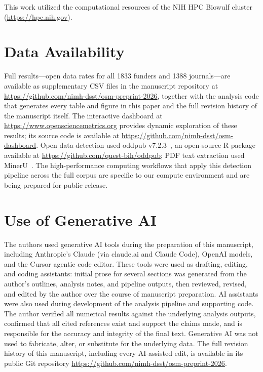 This work utilized the computational resources of the NIH HPC Biowulf cluster (\url{https://hpc.nih.gov}).

\section*{Data Availability}

Full results---open data rates for all \num{1833} funders and \num{1388} journals---are available as supplementary CSV files in the manuscript repository at \url{https://github.com/nimh-dsst/osm-preprint-2026}, together with the analysis code that generates every table and figure in this paper and the full revision history of the manuscript itself. The interactive dashboard at \url{https://www.opensciencemetrics.org} provides dynamic exploration of these results; its source code is available at \url{https://github.com/nimh-dsst/osm-dashboard}. Open data detection used oddpub v7.2.3~\cite{Riedel2020-fk}, an open-source R package available at \url{https://github.com/quest-bih/oddpub}; PDF text extraction used MinerU~\cite{Wang2024mineru}. The high-performance computing workflows that apply this detection pipeline across the full corpus are specific to our compute environment and are being prepared for public release.

\section*{Use of Generative AI}

The authors used generative AI tools during the preparation of this
manuscript, including Anthropic's Claude (via claude.ai and Claude Code),
OpenAI models, and the Cursor agentic code editor. These tools were used as
drafting, editing, and coding assistants: initial prose for several
sections was generated from the author's outlines, analysis notes, and
pipeline outputs, then reviewed, revised, and edited by the author over
the course of manuscript preparation. AI assistants were also used
during development of the analysis pipeline and supporting code. The
author verified all numerical results against the underlying analysis
outputs, confirmed that all cited references exist and support the
claims made, and is responsible for the accuracy and integrity of the
final text. Generative AI was not used to fabricate, alter, or
substitute for the underlying data. The full revision history of this manuscript,
including every AI-assisted edit, is available in its public Git repository
\url{https://github.com/nimh-dsst/osm-preprint-2026}.